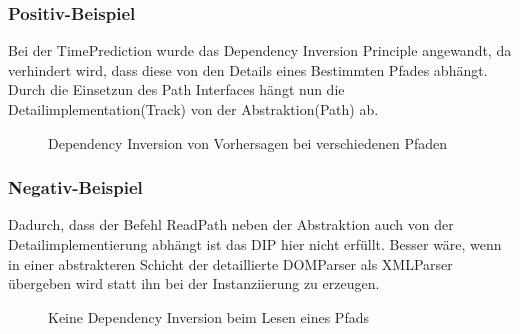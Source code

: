 \subsubsection{Positiv-Beispiel}

Bei der TimePrediction wurde das Dependency Inversion Principle angewandt, da verhindert wird, dass diese von den Details eines Bestimmten Pfades abhängt. Durch die Einsetzun des Path Interfaces hängt nun die Detailimplementation(Track) von der Abstraktion(Path) ab.

\begin{figure}[H]
  \centering
  
  \caption{Dependency Inversion von Vorhersagen bei verschiedenen Pfaden}
\end{figure}

\subsubsection{Negativ-Beispiel}

Dadurch, dass der Befehl ReadPath neben der Abstraktion auch von der Detailimplementierung abhängt ist das DIP hier nicht erfüllt. Besser wäre, wenn in einer abstrakteren Schicht der detaillierte DOMParser als XMLParser übergeben wird statt ihn bei der Instanziierung zu erzeugen.

\begin{figure}[H]
  \centering
  
  \caption{Keine Dependency Inversion beim Lesen eines Pfads}
\end{figure}


